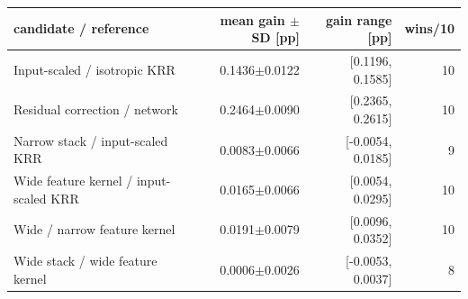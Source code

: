 \begin{tabular}{lrrr}
\toprule
candidate / reference & mean gain $\pm$ SD [pp] & gain range [pp] & wins/10 \\
\midrule
Input-scaled / isotropic KRR & 0.1436$\pm$0.0122 & [0.1196, 0.1585] & 10 \\
Residual correction / network & 0.2464$\pm$0.0090 & [0.2365, 0.2615] & 10 \\
Narrow stack / input-scaled KRR & 0.0083$\pm$0.0066 & [-0.0054, 0.0185] & 9 \\
Wide feature kernel / input-scaled KRR & 0.0165$\pm$0.0066 & [0.0054, 0.0295] & 10 \\
Wide / narrow feature kernel & 0.0191$\pm$0.0079 & [0.0096, 0.0352] & 10 \\
Wide stack / wide feature kernel & 0.0006$\pm$0.0026 & [-0.0053, 0.0037] & 8 \\
\bottomrule
\end{tabular}
